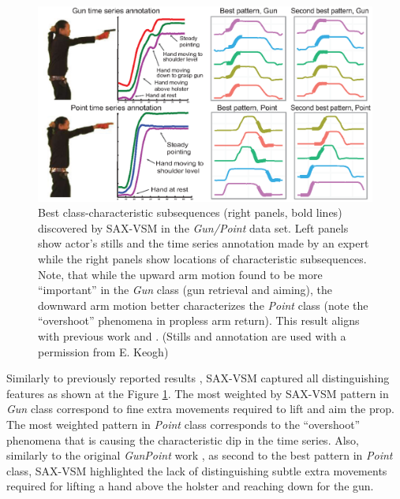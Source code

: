 \begin{figure}[t]
   \centering
   \includegraphics[width=130mm]{figures/gun-point.eps}
   \caption[Best class-characteristic subsequences (right panels, bold lines) discovered by SAX-VSM in
   the \textit{Gun/Point} data set.]{Best class-characteristic subsequences (right panels, bold lines) discovered by SAX-VSM in
   the \textit{Gun/Point} data set. 
   Left panels show actor's stills and the time series annotation made by an expert while the right panels 
   show locations of characteristic subsequences.
   Note, that while the upward arm motion found to be more ``important'' in the \textit{Gun} class 
   (gun retrieval and aiming), the downward arm motion better characterizes the \textit{Point} class 
   (note the ``overshoot'' phenomena in propless arm return). 
   This result aligns with previous work \cite{citeulike:7344347} and \cite{citeulike:11345338}.
   (Stills and annotation are used with a permission from E. Keogh) }
   \label{fig:shapelet-like-patterns}
\end{figure}

Similarly to previously reported results \cite{citeulike:7344347} \cite{citeulike:11345338}, 
SAX-VSM captured all distinguishing features as shown at the Figure \ref{fig:shapelet-like-patterns}. 
The most weighted by SAX-VSM pattern in \textit{Gun} class correspond to fine extra movements required to 
lift and aim the prop. 
The most weighted pattern in \textit{Point} class corresponds to the ``overshoot'' phenomena that is causing the 
characteristic dip in the time series. 
Also, similarly to the original \textit{GunPoint} work \cite{Ratanamahatana04makingtime-series}, as second to the best 
pattern in \textit{Point} class, SAX-VSM highlighted the lack of distinguishing subtle extra movements required
for lifting a hand above the holster and reaching down for the gun.


